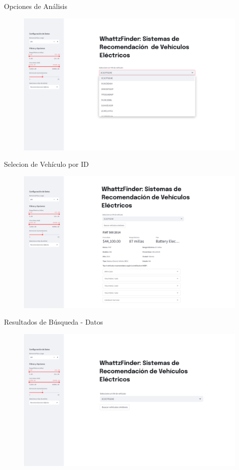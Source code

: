 \documentclass[12pt]{article}
\begin{document}
Opciones de Análisis
\begin{figure}[htbp]
    \centering
    \includegraphics[width=\textwidth]{./imgs-latex/img2.png}\label{fig:img2}
\end{figure}

Selecion de Vehículo por ID
\begin{figure}[htbp]
    \centering
    \includegraphics[width=\textwidth]{./imgs-latex/img3.png}\label{fig:img3}
\end{figure}

Resultados de Búsqueda - Datos
\begin{figure}[htbp]
    \centering
    \includegraphics[width=\textwidth]{./imgs-latex/img4.png}\label{fig:img4}
\end{figure}
\end{document}
